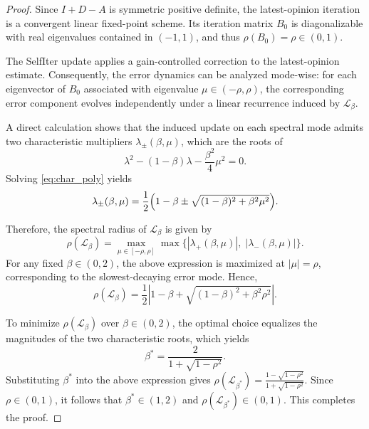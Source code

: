 \documentclass[sigconf,review, nonacm]{acmart}
\renewcommand\AA{\boldsymbol{\mathit{A}}}
\newcommand\DD{\boldsymbol{\mathit{D}}}
\newcommand\II{\boldsymbol{\mathit{I}}}
\begin{document}
\begin{proof}
	Since $\II+\DD-\AA$ is symmetric positive definite, the latest-opinion iteration
	is a convergent linear fixed-point scheme.
	Its iteration matrix $B_0$ is diagonalizable with real eigenvalues contained in
	$(-1,1)$, and thus $\rho(B_0)=\rho\in(0,1)$.
	
	The SelfIter update applies a gain-controlled correction to the latest-opinion
	estimate.
	Consequently, the error dynamics can be analyzed mode-wise: for each eigenvector
	of $B_0$ associated with eigenvalue $\mu\in(-\rho,\rho)$, the corresponding error
	component evolves independently under a linear recurrence induced by $\mathcal{L}_\beta$.
	
	A direct calculation shows that the induced update on each spectral mode admits
	two characteristic multipliers $\lambda_\pm(\beta,\mu)$, which are the roots of
	\begin{equation}
		\lambda^2 - (1-\beta)\lambda - \frac{\beta^2}{4}\mu^2 = 0.
		\label{eq:char_poly}
	\end{equation}
	Solving \eqref{eq:char_poly} yields
	\[
	\lambda_{\pm}(\beta,\mu)
	= \frac{1}{2}\Bigl(1-\beta \pm \sqrt{(1-\beta)^2 + \beta^2\mu^2}\Bigr).
	\]
	
	Therefore, the spectral radius of $\mathcal{L}_\beta$ is given by
	\[
	\rho(\mathcal{L}_\beta)
	= \max_{\mu\in[-\rho,\rho]}
	\max\bigl\{|\lambda_+(\beta,\mu)|,\;|\lambda_-(\beta,\mu)|\bigr\}.
	\]
	For any fixed $\beta\in(0,2)$, the above expression is maximized at
	$|\mu|=\rho$, corresponding to the slowest-decaying error mode.
	Hence,
	\[
	\rho(\mathcal{L}_\beta)
	= \frac{1}{2}\left|1-\beta + \sqrt{(1-\beta)^2 + \beta^2\rho^2}\right|.
	\]
	
	To minimize $\rho(\mathcal{L}_\beta)$ over $\beta\in(0,2)$, the optimal choice
	equalizes the magnitudes of the two characteristic roots,
	which yields
	\[
	\beta^* = \frac{2}{1+\sqrt{1-\rho^2}}.
	\]
	Substituting $\beta^*$ into the above expression gives
	$
	\rho(\mathcal{L}_{\beta^*})
	= \frac{1-\sqrt{1-\rho^2}}{1+\sqrt{1-\rho^2}}.$
	Since $\rho\in(0,1)$, it follows that $\beta^*\in(1,2)$ and
	$\rho(\mathcal{L}_{\beta^*})\in(0,1)$.
	This completes the proof.
\end{proof}
\end{document}
